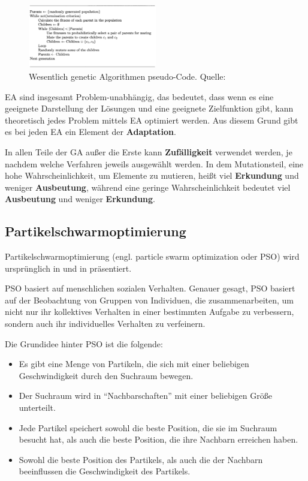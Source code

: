 \documentclass[twoside,twocolumn]{article}
\begin{document}
\begin{figure}
\caption{Wesentlich genetic Algorithmen pseudo-Code. Quelle: \cite[p.~50]{wiley_evolutionary}}
\label{fig:ga_pseudo}
\centering
\includegraphics[width=0.5\textwidth]{images/ga_pseudo.png}
\end{figure}

EA sind insgesamt Problem-unabhängig, das bedeutet, dass wenn es eine geeignete Darstellung der Lösungen und eine geeignete Zielfunktion gibt, kann theoretisch jedes Problem mittels EA optimiert werden. Aus diesem Grund gibt es bei jeden EA ein Element der \textbf{Adaptation}.\par
In allen Teile der GA außer die Erste kann \textbf{Zufälligkeit} verwendet werden, je nachdem welche Verfahren jeweils ausgewählt werden. In dem Mutationsteil, eine hohe Wahrscheinlichkeit, um Elemente zu mutieren, heißt viel \textbf{Erkundung} und weniger \textbf{Ausbeutung}, während eine geringe Wahrscheinlichkeit bedeutet viel \textbf{Ausbeutung} und weniger \textbf{Erkundung}.

\subsection{Partikelschwarmoptimierung}
Partikelschwarmoptimierung (engl. particle swarm optimization oder PSO) wird ursprünglich in \cite{kennedy_pso} und in \cite{shi_pso} präsentiert.\par
PSO basiert auf menschlichen sozialen Verhalten. \cite{eberhart_pso} Genauer gesagt, PSO basiert auf der Beobachtung von Gruppen von Individuen, die zusammenarbeiten, um nicht nur ihr kollektives Verhalten in einer bestimmten Aufgabe zu verbessern, sondern auch ihr individuelles Verhalten zu verfeinern.\par
Die Grundidee hinter PSO ist die folgende:

\begin{itemize}
\item{Es gibt eine Menge von Partikeln, die sich mit einer beliebigen Geschwindigkeit durch den Suchraum bewegen.}
\item{Der Suchraum wird in \enquote{Nachbarschaften} mit einer beliebigen Größe unterteilt.}
\item{Jede Partikel speichert sowohl die beste Position, die sie im Suchraum besucht hat, als auch die beste Position, die ihre Nachbarn erreichen haben.}
\item{Sowohl die beste Position des Partikels, als auch die der Nachbarn beeinflussen die Geschwindigkeit des Partikels.}
\end{itemize}
\end{document}

